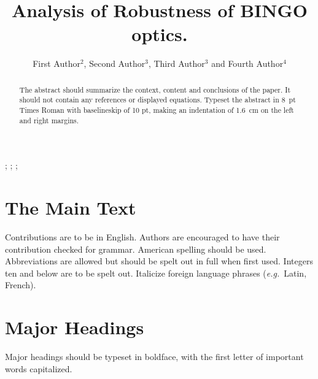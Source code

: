 \documentclass{ws-jai}
\begin{document}
\catchline{}{}{}{}{} %


\title{Analysis of Robustness of BINGO optics.}

\author{First Author$^{2}$, Second Author$^{3}$, Third Author$^{3}$ and Fourth Author$^{4}$}

\address{
$^{2}$Department, University Name, City, State ZIP/Zone, Country, fauthor@university.com\\
$^{3}$Group, Company, Address, City, State ZIP/Zone, Country\\
$^{4}$Group, Company, Address, City, State ZIP/Zone, Country, fauthor@company.com
}

\maketitle


\begin{history}
;
;
;
\end{history}

\begin{abstract}
The abstract should summarize the context, content and conclusions
of the paper. It should not contain any references or displayed
equations. Typeset the abstract in 8~pt Times Roman with
baselineskip of 10 pt, making an indentation of 1.6~cm on the left
and right margins.
\end{abstract}


\section{The Main Text}
\noindent Contributions are to be in English. Authors are
encouraged to have their contribution checked for grammar.
American spelling should be used. Abbreviations are allowed but
should be spelt out in full when first used. Integers ten and
below are to be spelt out. Italicize foreign language phrases
({\it e.g.}~Latin, French).

\section{Major Headings}
Major headings should be typeset in boldface, with the first
letter of important words capitalized.
\end{document}
